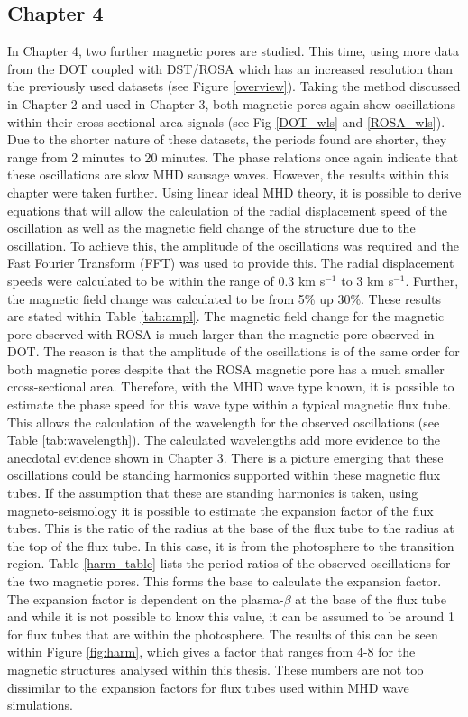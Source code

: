     \subsection{Chapter 4}
    	
    In Chapter 4, two further magnetic pores are studied.
    This time, using more data from the DOT coupled with DST/ROSA which has an increased resolution than the previously used datasets (see Figure \ref{overview}).
    Taking the method discussed in Chapter 2 and used in Chapter 3, both magnetic pores again show oscillations within their cross-sectional area signals (see Fig \ref{DOT_wls} and \ref{ROSA_wls}).     
    Due to the shorter nature of these datasets, the periods found are shorter, they range from 2 minutes to 20 minutes.
    The phase relations once again indicate that these oscillations are slow MHD sausage waves.
    However, the results within this chapter were taken further.
    Using linear ideal MHD theory, it is possible to derive equations that will allow the calculation of the radial displacement speed of the oscillation as well as the magnetic field change of the structure due to the oscillation.
    To achieve this, the amplitude of the oscillations was required and the Fast Fourier Transform (FFT) was used to provide this.
    The radial displacement speeds were calculated to be within the range of 0.3 km s$^{-1}$ to 3 km s$^{-1}$. 
    Further, the magnetic field change was calculated to be from 5\% up 30\%. 
    These results are stated within Table \ref{tab:ampl}.
    The magnetic field change for the magnetic pore observed with ROSA is much larger than the magnetic pore observed in DOT.
    The reason is that the amplitude of the oscillations is of the same order for both magnetic pores despite that the ROSA magnetic pore has a much smaller cross-sectional area.
    Therefore, with the MHD wave type known, it is possible to estimate the phase speed for this wave type within a typical magnetic flux tube.
    This allows the calculation of the wavelength for the observed oscillations (see Table \ref{tab:wavelength}).
    The calculated wavelengths add more evidence to the anecdotal evidence shown in Chapter 3.
    There is a picture emerging that these oscillations could be standing harmonics supported within these magnetic flux tubes. 
    If the assumption that these are standing harmonics is taken, using magneto-seismology it is possible to estimate the expansion factor of the flux tubes.
    This is the ratio of the radius at the base of the flux tube to the radius at the top of the flux tube.
    In this case, it is from the photosphere to the transition region.
    Table \ref{harm_table} lists the period ratios of the observed oscillations for the two magnetic pores.
    This forms the base to calculate the expansion factor.
    The expansion factor is dependent on the plasma-$\beta$ at the base of the flux tube and while it is not possible to know this value, it can be assumed to be around 1 for flux tubes that are within the photosphere.
    The results of this can be seen within Figure \ref{fig:harm}, which gives a factor that ranges from 4-8 for the magnetic structures analysed within this thesis.
    These numbers are not too dissimilar to the expansion factors for flux tubes used within MHD wave simulations.

